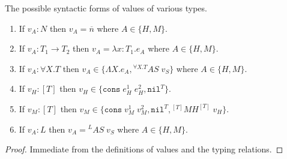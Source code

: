 \begin{lemma}
\label{cf}
\onehalfspacing
The possible syntactic forms of values of various types.
\begin{enumerate}
\item If $v_{A}:N$ then $v_{A}=\overline{n}$ where $A\in\lbrace H,M\rbrace$.
\item If $v_{A}:T_{1}\rightarrow T_{2}$ then $v_{A}=\lambda x:T_{1}.e_{A}$ where $A\in\lbrace H,M\rbrace$.
\item If $v_{A}:\forall X.T$ then $v_{A}\in\lbrace\Lambda X.e_{A},{^{\forall X.T}A}S\;v_{S}\rbrace$ where $A\in\lbrace H,M\rbrace$.
\item If $v_{H}:[T]$ then $v_{H}\in\lbrace\mathtt{cons}\;e_{H}^{1}\;e_{H}^{2},\mathtt{nil}^{T}\rbrace$.
\item If $v_{M}:[T]$ then $v_{M}\in\lbrace\mathtt{cons}\;v_{M}^{1}\;v_{M}^{2},\mathtt{nil}^{T},{^{[T]}M}H^{[T]}\;v_{H}\rbrace$.
\item If $v_{A}:L$ then $v_{A}={^{L}A}S\;v_{S}$ where $A\in\lbrace H,M\rbrace$.
\end{enumerate}
\begin{proof}
Immediate from the definitions of values and the typing relations.
\end{proof}
\end{lemma}